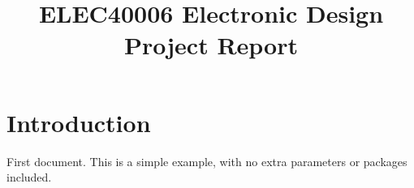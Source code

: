 \documentclass{report}
\begin{document}
\title{ELEC40006 Electronic Design Project Report}
\author{}
\section{Introduction}

First document. This is a simple example, with no 
extra parameters or packages included.
\end{document}
